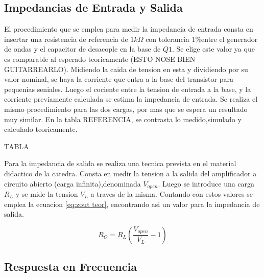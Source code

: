 \subsection{Impedancias de Entrada y Salida}

El procedimiento que se emplea para medir la impedancia de entrada consta en insertar una resistencia de referencia de $1 k\Omega$ con tolerancia $1\%$entre el generador de ondas y el capacitor de desacople en la base de $Q1$. Se elige este valor ya que es comparable al esperado teoricamente (ESTO NOSE BIEN GUITARREARLO).
Midiendo la caida de tension en esta y dividiendo por su valor nominal, se haya la corriente que entra a la base del transistor para pequenias seniales. Luego el cociente entre la tension de entrada a la base, y la corriente previamente calculada se estima la impedancia de entrada.
Se realiza el mismo procedimiento para las dos cargas, por mas que se espera un resultado muy similar. En la tabla REFERENCIA, se contrasta lo medido,simulado y calculado teoricamente.

TABLA  

Para la impedancia de salida se realiza una tecnica prevista en el material didactico de la catedra. Consta en medir la tension a la salida del amplificador a circuito abierto (carga infinita),denominada $V_{open}$. Luego se introduce una carga $R_L$ y se mide la tension $V_L$ a traves de la misma.
Contando con estos valores se emplea la ecuacion \ref{eq:zout teor}, encontrando asi un valor para la impedancia de salida.

\begin{equation}
    R_O = R_L(\frac{V_{open}}{V_L}-1)
    \label{eq:zout teor}
\end{equation}

\subsection{Respuesta en Frecuencia}

